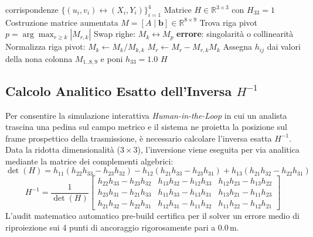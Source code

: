 \documentclass[11pt,a4paper]{article}
\begin{document}
\begin{algorithm}[H]
\caption{Risoluzione DLT $8 \times 8$ con Gauss-Jordan a Pivoting Parziale}
\begin{algorithmic}[1]
 corrispondenze $\{(u_i, v_i) \leftrightarrow (X_i, Y_i)\}_{i=1}^4$
\Ensure Matrice $H \in \mathbb{R}^{3 \times 3}$ con $H_{33} = 1$
\State Costruzione matrice aumentata $M = [A \mid \mathbf{b}] \in \mathbb{R}^{8 \times 9}$
    \State Trova riga pivot $p = \arg\max_{r \ge k} |M_{r, k}|$
    \State Swap righe: $M_k \leftrightarrow M_p$
     \State \textbf{errore}: singolarità o collinearità \EndIf
    \State Normalizza riga pivot: $M_k \leftarrow M_k / M_{k, k}$
        \State $M_r \leftarrow M_r - M_{r, k} M_k$
    \EndFor
\EndFor
\State Assegna $h_{ij}$ dai valori della nona colonna $M_{1..8, 9}$ e poni $h_{33} = 1.0$
\State \Return $H$
\end{algorithmic}
\end{algorithm}

\subsection{Calcolo Analitico Esatto dell'Inversa $H^{-1}$}
Per consentire la simulazione interattiva \textsl{Human-in-the-Loop} in cui un analista trascina una pedina sul campo metrico e il sistema ne proietta la posizione sul frame prospettico della trasmissione, è necessario calcolare l'inversa esatta $H^{-1}$. Data la ridotta dimensionalità ($3 \times 3$), l'inversione viene eseguita per via analitica mediante la matrice dei complementi algebrici:
\begin{equation}
\det(H) = h_{11}(h_{22}h_{33} - h_{23}h_{32}) - h_{12}(h_{21}h_{33} - h_{23}h_{31}) + h_{13}(h_{21}h_{32} - h_{22}h_{31})
\end{equation}
\begin{equation}
H^{-1} = \frac{1}{\det(H)} \begin{bmatrix}
h_{22}h_{33} - h_{23}h_{32} & h_{13}h_{32} - h_{12}h_{33} & h_{12}h_{23} - h_{13}h_{22} \\
h_{23}h_{31} - h_{21}h_{33} & h_{11}h_{33} - h_{13}h_{31} & h_{13}h_{21} - h_{11}h_{23} \\
h_{21}h_{32} - h_{22}h_{31} & h_{12}h_{31} - h_{11}h_{32} & h_{11}h_{22} - h_{12}h_{21}
\end{bmatrix}
\end{equation}
L'audit matematico automatico pre-build certifica per il solver un errore medio di riproiezione sui 4 punti di ancoraggio rigorosamente pari a $0.0\,\text{m}$.
\end{document}
